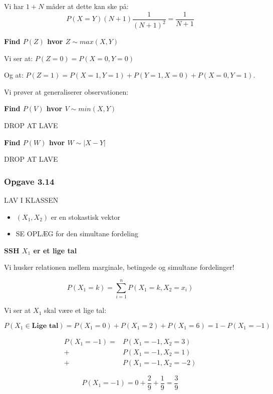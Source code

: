Vi har $1+N$ måder at dette kan ske på:
\begin{equation}
    P(X=Y) (N+1)\frac{1}{(N+ 1)^2}= \frac{1}{N+1}
\end{equation}

\textbf{Find $P(Z)$ hvor $Z \sim max(X,Y)$}

Vi ser at: 
$P(Z = 0) =  P(X = 0, Y = 0)$

Og at:
$P(Z=1) = P(X = 1, Y = 1) + P(Y = 1, X= 0) + P(X = 0, Y = 1)$.

Vi prøver at generaliserer observationen: 


\textbf{Find $P(V)$ hvor $V \sim min(X,Y)$}

DROP AT LAVE

\textbf{Find $P(W)$ hvor $W \sim
\lvert X - Y \rvert$}

DROP AT LAVE
\subsubsection{Opgave 3.14}

LAV I KLASSEN

\begin{itemize}
    \item $(X_1, X_2)$ er en stokastisk vektor
    \item SE OPLÆG for den simultane fordeling
\end{itemize}

\textbf{SSH $X_1$ er et lige tal}

Vi husker relationen mellem marginale, betingede og simultane fordelinger!

\begin{equation}
    P(X_1 = k) = \sum_{i=1}^n P(X_1 = k, X_2 = x_i) 
\end{equation}

Vi ser at $X_1$ skal være et lige tal:

\begin{equation}
    P(X_1 \in \textbf{Lige tal}) = P(X_1 = 0) + P(X_1 = 2) + P(X_1 = 6) = 1 - P(X_{1}=-1)
\end{equation}


\begin{align}
   P(X_{1}=-1) = &P(X_1 = -1, X_2= 3)\\ + &P(X_1 = -1, X_2 = 1) \\ +&P(X_1 = -1, X_2 = -2)
\end{align}

\begin{equation}
       P(X_{1}=-1) = 0 + \frac{2}{9} + \frac{1}{9} = \frac{3}{9} 
\end{equation}

